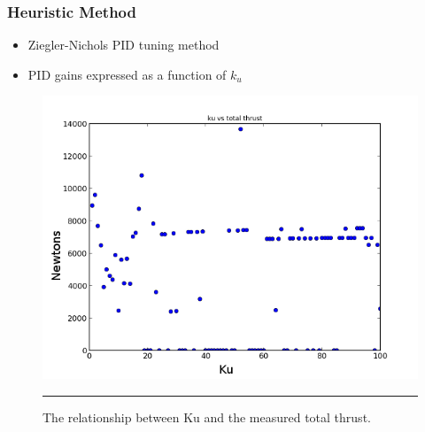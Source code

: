 \documentclass{beamer}
\begin{document}
\begin{frame}

\frametitle{Heuristic Method}
 
\begin{itemize}
\item Ziegler-Nichols PID tuning method
\item PID gains expressed as a function of $k_u$
\end{itemize}

\begin{figure}[htbp]
	\centering
		\includegraphics[width=\textwidth]{Figures/kuvsthrust.png}
		\rule{35em}{0.5pt}
	\caption[ku vs thrust]{The relationship between Ku and the measured total thrust.}
	\label{fig:ku vs thrust}
\end{figure}

\end{frame}
\end{document}
